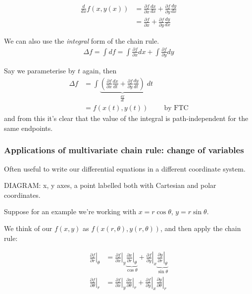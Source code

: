 \documentclass{../../template/note}
\begin{document}
    \begin{align*}
        \frac{d}{dx} f(x, y(x)) &= \frac{\partial f}{\partial x}\frac{dx}{dx} + \frac{\partial f}{\partial y}\frac{dy}{dx} \\
        &= \frac{\partial f}{\partial x} + \frac{\partial f}{\partial y}\frac{dy}{dx}
    \end{align*}
    
    We can also use the \emph{integral} form of the chain rule.
    \begin{align*}
        \Delta f = \int df = \int \frac{\partial f}{\partial x} dx + \int \frac{\partial f}{\partial y} dy
    \end{align*}
    
    Say we parameterise by \(t\) again, then 
    \begin{align*}
        \Delta f &= \int \underbrace{\left(\frac{\partial f}{\partial x}\frac{dx}{dt} + \frac{\partial f}{\partial y}\frac{dy}{dt}\right)}_{\displaystyle\frac{df}{dt}} \; dt \\
        &= f(x(t), y(t)) && \text{by FTC}
    \end{align*}
    and from this it's clear that the value of the integral is path-independent for the same endpoints.

    \subsubsection{Applications of multivariate chain rule: change of variables}

    Often useful to write our differential equations in a different coordinate system.


    DIAGRAM: x, y axes, a point labelled both with Cartesian and polar coordinates.

    Suppose for an example we're working with \(x = r \cos \theta\), \(y = r \sin \theta\).

    We think of our \(f(x, y)\) as \(f(x(r, \theta), y(r, \theta))\), and then apply the chain rule:

    \begin{align*}
        \left.\frac{\partial f}{\partial r}\right|_{\theta} &= \left.\frac{\partial f}{\partial x} \right|_y \underbrace{\left.\frac{\partial x}{\partial r}\right|_{\theta}}_{\cos \theta} + \left.\frac{\partial f}{\partial y}\right|_x \underbrace{\left.\frac{\partial y}{\partial r}\right|_{\theta}}_{\sin \theta} \\
        \left.\frac{\partial f}{\partial \theta}\right|_{r} &= \left.\frac{\partial f}{\partial x} \right|_y \left.\frac{\partial x}{\partial \theta}\right|_{r} + \left.\frac{\partial f}{\partial y}\right|_x \left.\frac{\partial y}{\partial \theta}\right|_{r}
    \end{align*}
    
\end{document}
